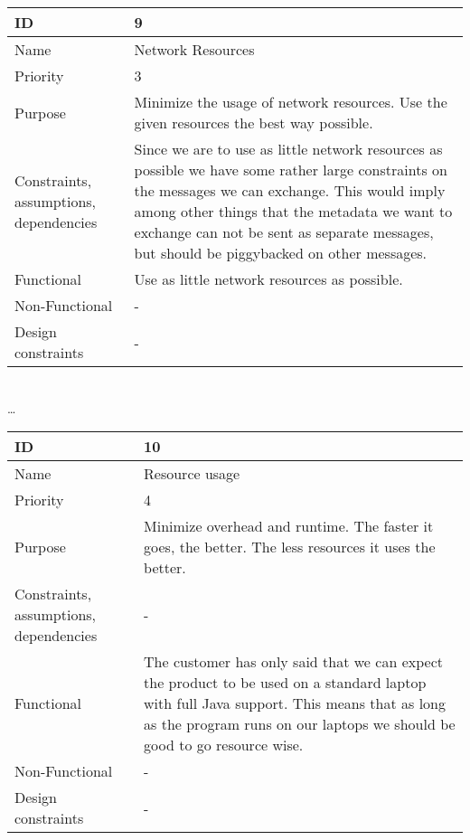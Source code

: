 \begin{center}
	\begin{tabular}{| p{4cm} | p{8cm} |}
		\hline
		ID & 9 \\
		\hline
		Name & Network Resources \\
		\hline
		Priority & 3 \\
		\hline
		Purpose & Minimize the usage of network resources. Use the given resources the best way possible. \\
		\hline 
		Constraints, assumptions, dependencies & Since we are to use as little network resources as possible we have some rather large constraints on the messages we can exchange. This would imply among other things that the metadata we want to exchange can not be sent as separate messages, but should be piggybacked on other messages. \\
		\hline  
		Functional & Use as little network resources as possible.\\
		\hline
		Non-Functional & -\\ 
		\hline
		Design constraints & -\\
		\hline
	\end{tabular}
	\\  \ldots  \\

	\begin{tabular}{| p{4cm} | p{8cm} |}
		\hline
		ID & 10 \\
		\hline
		Name & Resource usage  \\
		\hline
		Priority & 4 \\
		\hline
		Purpose & Minimize overhead and runtime. The faster it goes, the better. The less resources it uses the better. \\
		\hline 
		Constraints, assumptions, dependencies & -\\
		\hline  
		Functional & The customer has only said that we can expect the product to be used on a standard laptop with full Java support. This means that as long as the program runs on our laptops we should be good to go resource wise. \\
		\hline
		Non-Functional & -\\ 
		\hline
		Design constraints & -\\
		\hline
	\end{tabular}
\end{center}
\\
